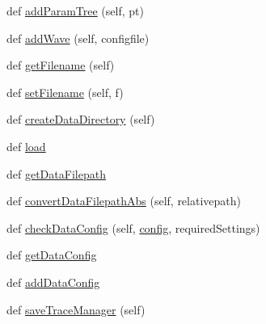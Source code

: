 \begin{DoxyCompactItemize}
\item 
def \hyperlink{classsoftware_1_1chipwhisperer_1_1common_1_1api_1_1ProjectFormat_1_1ProjectFormat_a855d2537df67af22f1935aebd022c87a}{add\+Param\+Tree} (self, pt)
\item 
def \hyperlink{classsoftware_1_1chipwhisperer_1_1common_1_1api_1_1ProjectFormat_1_1ProjectFormat_a658257cc91acc2a3e63d70de9e21898c}{add\+Wave} (self, configfile)
\item 
def \hyperlink{classsoftware_1_1chipwhisperer_1_1common_1_1api_1_1ProjectFormat_1_1ProjectFormat_aaabaef9b37679d6aa9fafd2561517e87}{get\+Filename} (self)
\item 
def \hyperlink{classsoftware_1_1chipwhisperer_1_1common_1_1api_1_1ProjectFormat_1_1ProjectFormat_a71fd24f5ec95402241934eba47c34d98}{set\+Filename} (self, f)
\item 
def \hyperlink{classsoftware_1_1chipwhisperer_1_1common_1_1api_1_1ProjectFormat_1_1ProjectFormat_a138b2d1a3d4a47e36f74442336d818ae}{create\+Data\+Directory} (self)
\item 
def \hyperlink{classsoftware_1_1chipwhisperer_1_1common_1_1api_1_1ProjectFormat_1_1ProjectFormat_a6857a8c5c4a29f70ce1e735b95341077}{load}
\item 
def \hyperlink{classsoftware_1_1chipwhisperer_1_1common_1_1api_1_1ProjectFormat_1_1ProjectFormat_a6fbbda5a6d0e84b3cba7d5d4fa2d1eb9}{get\+Data\+Filepath}
\item 
def \hyperlink{classsoftware_1_1chipwhisperer_1_1common_1_1api_1_1ProjectFormat_1_1ProjectFormat_a92eb4b1cb6d518310df34c1b00c2e8be}{convert\+Data\+Filepath\+Abs} (self, relativepath)
\item 
def \hyperlink{classsoftware_1_1chipwhisperer_1_1common_1_1api_1_1ProjectFormat_1_1ProjectFormat_a8851d5b9239c9ddce95cf46ff80ae2e8}{check\+Data\+Config} (self, \hyperlink{classsoftware_1_1chipwhisperer_1_1common_1_1api_1_1ProjectFormat_1_1ProjectFormat_a5111622c8372929c0eec5fdc3ab6cf42}{config}, required\+Settings)
\item 
def \hyperlink{classsoftware_1_1chipwhisperer_1_1common_1_1api_1_1ProjectFormat_1_1ProjectFormat_a773b04174e0b332a9e91fa31e2f9f2a3}{get\+Data\+Config}
\item 
def \hyperlink{classsoftware_1_1chipwhisperer_1_1common_1_1api_1_1ProjectFormat_1_1ProjectFormat_ac1a28b64a6e9f0576a0569a832f14f5c}{add\+Data\+Config}
\item 
def \hyperlink{classsoftware_1_1chipwhisperer_1_1common_1_1api_1_1ProjectFormat_1_1ProjectFormat_a17011dfaf0cb7ce50877a41182ed8c7e}{save\+Trace\+Manager} (self)

\end{DoxyCompactItemize}
